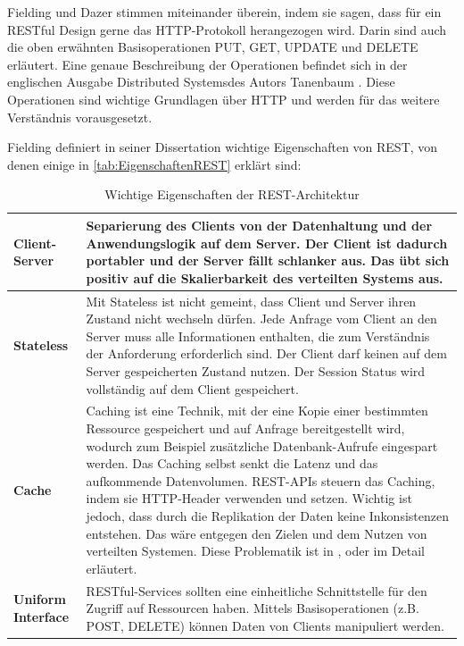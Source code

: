 \documentclass[a4paper,titlepage,halfparskip,12pt,listof=numbered]{scrreprt}
\begin{document}
\begin{onehalfspacing}
Fielding \cite[S.4]{fieldingREST} und Dazer \cite[S.2]{dazerRESTUeberblick} stimmen miteinander überein, indem sie sagen, dass für ein \ac{REST}ful Design gerne das \ac{HTTP}-Protokoll herangezogen wird. Darin sind auch die oben erwähnten Basisoperationen PUT, GET, UPDATE und DELETE erläutert. Eine genaue Beschreibung der Operationen befindet sich in der englischen Ausgabe \glqq Distributed Systems\grqq des Autors Tanenbaum \cite[S.65]{andrew2008distributed}. Diese Operationen sind wichtige Grundlagen über \ac{HTTP} und werden für das weitere Verständnis vorausgesetzt.

Fielding definiert in seiner Dissertation wichtige Eigenschaften von \ac{REST}, von denen einige in \autoref{tab:EigenschaftenREST} erklärt sind:

\begin{table}[h]
\centering
\caption{Wichtige Eigenschaften der \ac{REST}-Architektur \cite[S.78ff.]{fieldingREST}}
\begin{tabular}{|l|p{}|}
\hline
\textbf{Client-Server} & Separierung des Clients von der Datenhaltung und der Anwendungslogik auf dem Server. Der Client ist dadurch portabler und der Server fällt schlanker aus. Das übt sich positiv auf die Skalierbarkeit des verteilten Systems aus. \\
\hline
\textbf{Stateless} & Mit Stateless ist nicht gemeint, dass Client
und Server ihren Zustand nicht wechseln dürfen. Jede Anfrage vom Client an den Server muss alle Informationen enthalten, die zum Verständnis der Anforderung erforderlich sind. Der Client darf keinen auf dem Server gespeicherten Zustand nutzen. Der Session Status wird vollständig auf dem Client gespeichert.\\
\hline
\textbf{Cache} & Caching ist eine Technik, mit der eine Kopie einer bestimmten Ressource gespeichert und auf Anfrage bereitgestellt wird, wodurch zum Beispiel zusätzliche Datenbank-Aufrufe eingespart werden. Das Caching selbst senkt die Latenz und das aufkommende
Datenvolumen. REST-APIs steuern das Caching, indem sie HTTP-Header verwenden und setzen. Wichtig ist jedoch, dass durch die Replikation der Daten keine Inkonsistenzen entstehen. Das wäre entgegen den Zielen und dem Nutzen von verteilten Systemen. Diese Problematik ist in \cite[S.32]{andrew2008verteilte}, \cite[S45f.]{richterEinleitungVS} oder \cite[S.13]{pythonFlaskREST} im Detail erläutert. \\
\hline
\textbf{Uniform Interface} & \ac{REST}ful-Services sollten eine einheitliche Schnittstelle für den Zugriff auf Ressourcen haben. Mittels Basisoperationen (z.B. POST, DELETE) können Daten von Clients manipuliert werden. \\

\end{tabular}
\end{table}
\end{onehalfspacing}
\end{document}
